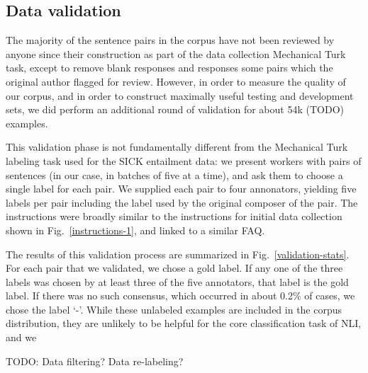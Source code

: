 
\subsection{Data validation}

The majority of the sentence pairs in the corpus have not been reviewed by anyone since their construction as part of the data collection Mechanical Turk task, except to remove blank responses and responses some pairs which the original author flagged for review. However, in order to measure the quality of our corpus, and in order to construct maximally useful testing and development sets, we did perform an additional round of validation for about 54k (TODO) examples.

This validation phase is not fundamentally different from the Mechanical Turk labeling task used for the SICK entailment data: we present workers with pairs of sentences (in our case, in batches of five at a time), and ask them to choose a single label for each pair. We supplied each pair to four annonators, yielding five labels per pair including the label used by the original composer of the pair. The instructions were broadly similar to the instructions for initial data collection shown in Fig.~\ref{instructions-1}, and linked to a similar FAQ.

The results of this validation process are summarized in Fig.~\ref{validation-stats}. For each pair that we validated, we chose a gold label. If any one of the three labels was chosen by at least three of the five annotators, that label is the gold label. If there was no such consensus, which occurred in about 0.2\% of cases, we chose the label `-'. While these unlabeled examples are included in the corpus distribution, they are unlikely to be helpful for the core classification task of NLI, and we 

TODO: Data filtering? Data re-labeling?

